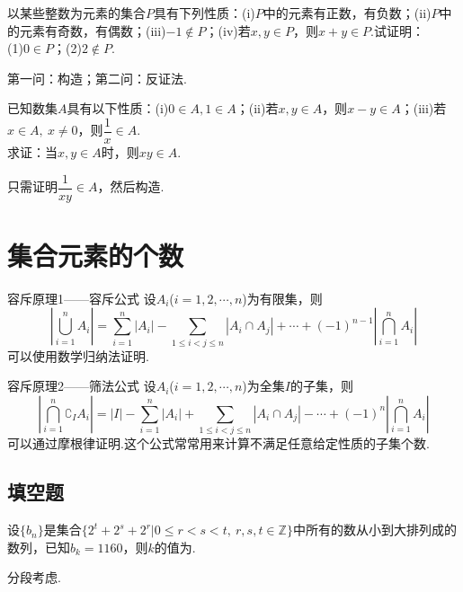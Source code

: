 \documentclass[lang=cn, zihao=4.5]{elegantbook}
\newcommand{\tk}{\uline{\hspace{4em}}}
\begin{document}
\begin{example} %
	以某些整数为元素的集合$P$具有下列性质：(i)$P$中的元素有正数，有负数；(ii)$P$中的元素有奇数，有偶数；(iii)$-1 \notin P$；(iv)若$x,y \in P$，则$x+y \in P$.试证明： \\
	(1)$0 \in P$；(2)$2 \notin P$.
\end{example}
\begin{hint}
	第一问：构造；第二问：反证法.
\end{hint}

\begin{example} %
	已知数集$A$具有以下性质：(i)$0 \in A,1 \in A$；(ii)若$x,y \in A$，则$x-y \in A$；(iii)若$x \in A, ~x \neq 0$，则$\dfrac{1}{x} \in A$. \\
	求证：当$x,y \in A$时，则$xy \in A$.
\end{example}
\begin{hint}
	只需证明$\dfrac{1}{xy} \in A$，然后构造.
\end{hint}

\newpage
\section{集合元素的个数}

\begin{theorem}{容斥原理1——容斥公式}
	设$A_i$($i=1,2, \cdots ,n$)为有限集，则
	$$|\bigcup_{i=1}^{n} A_i| = \sum_{i=1}^{n} |A_i|-\sum_{1 \leq i < j \leq n}|A_i \cap A_j| + \cdots + (-1)^{n-1} |\bigcap_{i=1}^{n} A_i|$$
	可以使用数学归纳法证明.
\end{theorem}

\begin{theorem}{容斥原理2——筛法公式}
	设$A_i$($i=1,2, \cdots ,n$)为全集$I$的子集，则
	$$|\bigcap_{i=1}^{n} \complement _{I} A_i| = |I| - \sum_{i=1}^{n} |A_i|+\sum_{1 \leq i < j \leq n}|A_i \cap A_j| - \cdots + (-1)^{n} |\bigcap_{i=1}^{n} A_i|$$
	可以通过摩根律证明.这个公式常常用来计算不满足任意给定性质的子集个数.
\end{theorem}

\subsection*{填空题}

\begin{example} %
	设$\{ b_n \}$是集合$\{ 2^t+2^s+2^r | 0 \leq r < s < t, ~r,s,t \in \mathbb{Z} \}$中所有的数从小到大排列成的数列，已知$b_k = 1160$，则$k$的值为\tk .
\end{example}
\begin{hint}
	分段考虑.
\end{hint}
\end{document}

